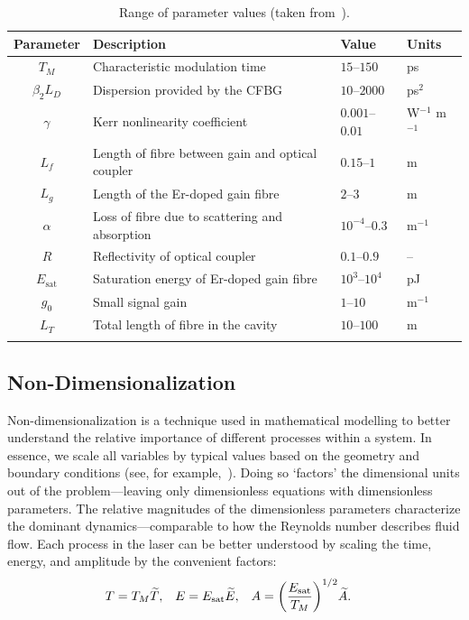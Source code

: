 \documentclass[9pt,twocolumn,twoside]{osajnl}
\let\originalleft\left
\let\originalright\right
\renewcommand{\left}{\mathopen{}\mathclose\bgroup\originalleft}
\renewcommand{\right}{\aftergroup\egroup\originalright}
\newcommand{\Es}{E_{\textrm{sat}}} %
\begin{document}
\begin{table}[!b]
	\centering
	\caption{Range of parameter values (taken from~\cite{agrawal2013, burgoyne2014, burgoyneemail, tamura1996, usechak2005}).}
 	\label{tab:values}
 	\begin{tabular}{clll}
		\hline
		Parameter & Description & Value & Units \\
		\hline\noalign{\smallskip}
		$T_M$ & Characteristic modulation time & $15$--$150$ & ps \\
		$\beta_2 L_D$ & Dispersion provided by the CFBG & $10$--$2000$ & ps$^2$ \\
		$\gamma$ & Kerr nonlinearity coefficient & $0.001$--$0.01$ & W$^{-1}$ m$^{-1}$ \\
		$L_f$ & Length of fibre between gain and optical coupler & $0.15$--$1$ & m \\
		$L_g$ & Length of the Er-doped gain fibre & $2$--$3$ & m \\
		$\alpha$ & Loss of fibre due to scattering and absorption & $10^{-4}$--$0.3$ & m$^{-1}$ \\
		$R$ & Reflectivity of optical coupler & $0.1$--$0.9$ & -- \\
		$\Es$ & Saturation energy of Er-doped gain fibre & $10^3$--$10^4$ & pJ \\
		$g_0$ & Small signal gain &  $1$--$10$ & m$^{-1}$ \\
		$L_T$ & Total length of fibre in the cavity & $10$--$100$ & m \\
		\noalign{\smallskip}\hline
	\end{tabular}
\end{table}

\subsection{Non-Dimensionalization}
Non-dimensionalization is a technique used in mathematical modelling to better understand the relative importance of different processes within a system. In essence, we scale all variables by typical values based on the geometry and boundary conditions (see, for example,~\cite{howison2005}). Doing so `factors' the dimensional units out of the problem---leaving only dimensionless equations with dimensionless parameters. The relative magnitudes of the dimensionless parameters characterize the dominant dynamics---comparable to how the Reynolds number describes fluid flow. Each process in the laser can be better understood by scaling the time, energy, and amplitude by the convenient factors:
\begin{align}
	T &= T_M \widetilde{T},& E &= \Es \widetilde{E},& A &= \left( \frac{\Es}{T_M} \right)^{1/2} \widetilde{A}.
\end{align}
\end{document}
